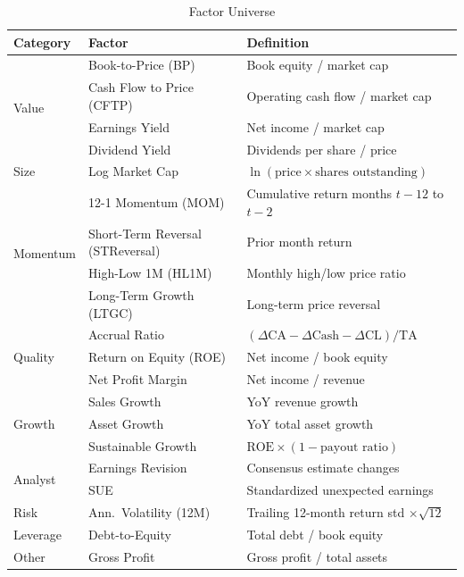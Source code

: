 \documentclass[12pt,a4paper]{article}
\begin{document}
\begin{table}[H]
\centering
\caption{Factor Universe}
\label{tab:factors}
\small
\begin{tabular}{lll}
\toprule
\textbf{Category} & \textbf{Factor} & \textbf{Definition} \\
\midrule
\multirow{4}{*}{Value}
    & Book-to-Price (BP) & Book equity / market cap \\
    & Cash Flow to Price (CFTP) & Operating cash flow / market cap \\
    & Earnings Yield & Net income / market cap \\
    & Dividend Yield & Dividends per share / price \\
\midrule
Size & Log Market Cap & $\ln(\text{price} \times \text{shares outstanding})$ \\
\midrule
\multirow{4}{*}{Momentum}
    & 12-1 Momentum (MOM) & Cumulative return months $t{-}12$ to $t{-}2$ \\
    & Short-Term Reversal (STReversal) & Prior month return \\
    & High-Low 1M (HL1M) & Monthly high/low price ratio \\
    & Long-Term Growth (LTGC) & Long-term price reversal \\
\midrule
\multirow{3}{*}{Quality}
    & Accrual Ratio & $(\Delta\text{CA} - \Delta\text{Cash} - \Delta\text{CL}) / \text{TA}$ \\
    & Return on Equity (ROE) & Net income / book equity \\
    & Net Profit Margin & Net income / revenue \\
\midrule
\multirow{3}{*}{Growth}
    & Sales Growth & YoY revenue growth \\
    & Asset Growth & YoY total asset growth \\
    & Sustainable Growth & $\text{ROE} \times (1 - \text{payout ratio})$ \\
\midrule
\multirow{2}{*}{Analyst}
    & Earnings Revision & Consensus estimate changes \\
    & SUE & Standardized unexpected earnings \\
\midrule
Risk & Ann.\ Volatility (12M) & Trailing 12-month return std $\times \sqrt{12}$ \\
\midrule
Leverage & Debt-to-Equity & Total debt / book equity \\
\midrule
Other & Gross Profit & Gross profit / total assets \\
\bottomrule
\end{tabular}
\end{table}
\end{document}
